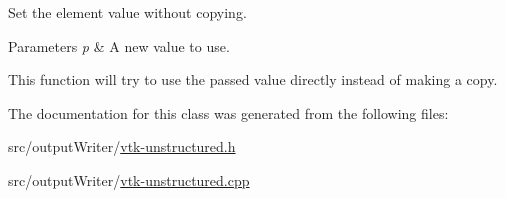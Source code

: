 Set the element value without copying. 


\begin{DoxyParams}{Parameters}
{\em p} & A new value to use.\\
\hline
\end{DoxyParams}
This function will try to use the passed value directly instead of making a copy. 

The documentation for this class was generated from the following files\+:\begin{DoxyCompactItemize}
\item 
src/output\+Writer/\hyperlink{vtk-unstructured_8h}{vtk-\/unstructured.\+h}\item 
src/output\+Writer/\hyperlink{vtk-unstructured_8cpp}{vtk-\/unstructured.\+cpp}\end{DoxyCompactItemize}
